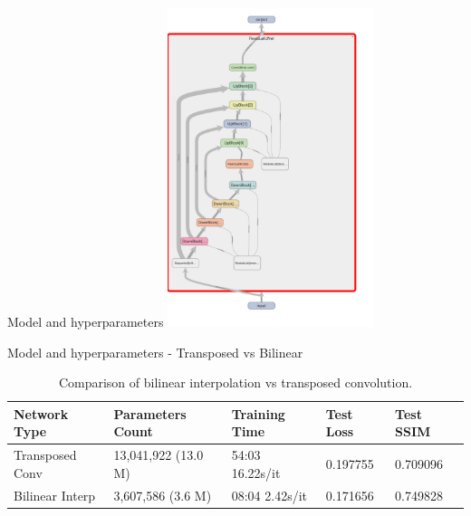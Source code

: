 \documentclass[footline=authortitle]{beamer}
\begin{document}
    \begin{frame}{Model and hyperparameters}
    \centering
    \includegraphics[width=0.45\textwidth]{images/unet_experiment_graph.png}
\end{frame}

\begin{frame}{Model and hyperparameters - Transposed vs Bilinear}

    \begin{table}[ht]
        \centering
        \scriptsize
        \begin{tabular}{|l|l|l|l|l|}
        \hline
        \textbf{Network Type} & \textbf{Parameters Count} & \textbf{Training Time} & \textbf{Test Loss} & \textbf{Test SSIM} \\
        \hline
        Transposed Conv & 13,041,922 (13.0 M) & 54:03 16.22s/it & 0.197755 & 0.709096 \\
        Bilinear Interp & 3,607,586 (3.6 M) & 08:04 2.42s/it & 0.171656 & 0.749828 \\
        \hline
        \end{tabular}
        \caption{Comparison of bilinear interpolation vs transposed convolution.}
        \label{tab:network_comparison}
    \end{table}
\end{frame}
\end{document}
